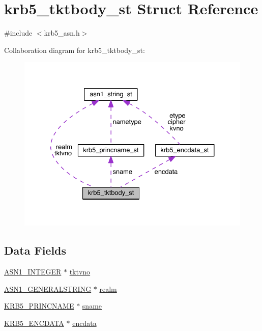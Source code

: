 \hypertarget{structkrb5__tktbody__st}{}\section{krb5\+\_\+tktbody\+\_\+st Struct Reference}
\label{structkrb5__tktbody__st}


{\ttfamily \#include $<$krb5\+\_\+asn.\+h$>$}



Collaboration diagram for krb5\+\_\+tktbody\+\_\+st\+:\nopagebreak
\begin{figure}[H]
\begin{center}
\leavevmode
\includegraphics[width=330pt]{structkrb5__tktbody__st__coll__graph}
\end{center}
\end{figure}
\subsection*{Data Fields}
\begin{DoxyCompactItemize}
\item 
\hyperlink{crypto_2ossl__typ_8h_af4335399bf9774cb410a5e93de65998b}{A\+S\+N1\+\_\+\+I\+N\+T\+E\+G\+ER} $\ast$ \hyperlink{structkrb5__tktbody__st_aebc63820b33bd4aaaaefb18a47298e58}{tktvno}
\item 
\hyperlink{crypto_2ossl__typ_8h_a7357d22f3b42ad606a72aad7f1668dd3}{A\+S\+N1\+\_\+\+G\+E\+N\+E\+R\+A\+L\+S\+T\+R\+I\+NG} $\ast$ \hyperlink{structkrb5__tktbody__st_affebdb30e43ecd6dcf7fb03b5cb89f2d}{realm}
\item 
\hyperlink{crypto_2krb5_2krb5__asn_8h_a1daa6bb370190eb1d769f39f88cf3bf2}{K\+R\+B5\+\_\+\+P\+R\+I\+N\+C\+N\+A\+ME} $\ast$ \hyperlink{structkrb5__tktbody__st_a471bc8ab962e6788697e0b1a99a90114}{sname}
\item 
\hyperlink{crypto_2krb5_2krb5__asn_8h_ad2eb70d74bfb579f1ef3fd6082cffd32}{K\+R\+B5\+\_\+\+E\+N\+C\+D\+A\+TA} $\ast$ \hyperlink{structkrb5__tktbody__st_a4cbd115849d6be79f117e6f5c1dec0ac}{encdata}
\end{DoxyCompactItemize}


